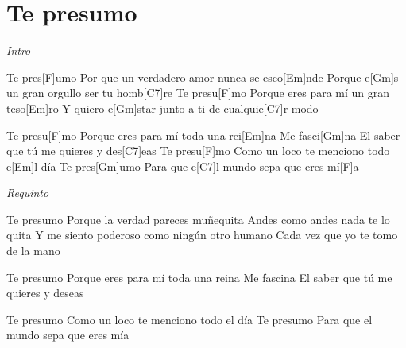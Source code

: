 \section{Te presumo}
\noindent

\vspace{1cm}

\begin{guitar}
	\begin{multicols}{2}
		\textit{Intro}
		\par

		Te pres[F]umo
		Por que un verdadero amor nunca se esco[Em]nde
		Porque e[Gm]s un gran orgullo ser tu homb[C7]re
		Te presu[F]mo
		Porque eres para mí un gran teso[Em]ro
		Y quiero e[Gm]star junto a ti de cualquie[C7]r modo

		Te presu[F]mo
		Porque eres para mí toda una rei[Em]na
		Me fasci[Gm]na
		El saber que tú me quieres y des[C7]eas
		Te presu[F]mo
		Como un loco te menciono todo e[Em]l día
		Te pres[Gm]umo
		Para que e[C7]l mundo sepa que eres mí[F]a

		\par
		\textit{Requinto}
		\par

		Te presumo
		Porque la verdad pareces muñequita
		Andes como andes nada te lo quita
		Y me siento poderoso como ningún otro humano
		Cada vez que yo te tomo de la mano

		Te presumo
		Porque eres para mí toda una reina
		Me fascina
		El saber que tú me quieres y deseas

		Te presumo
		Como un loco te menciono todo el día
		Te presumo
		Para que el mundo sepa que eres mía

	\end{multicols}
\end{guitar}
